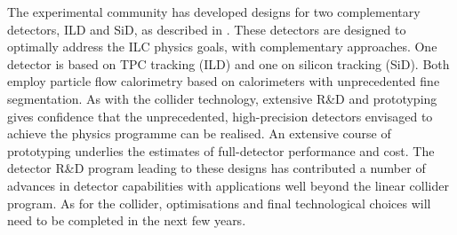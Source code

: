 The experimental community has developed
designs for two complementary detectors, ILD and SiD, 
as described in \cite{Behnke:2013lya}. These detectors are designed to 
optimally address the
ILC physics goals, with complementary approaches. One detector is based on
TPC tracking (ILD) and one on silicon tracking (SiD).
Both employ particle flow calorimetry based on
calorimeters with unprecedented fine segmentation.
As with the collider technology, 
extensive R\&D and prototyping gives confidence that the
unprecedented,
high-precision detectors envisaged to achieve the 
physics programme can be realised.
An extensive course of
prototyping underlies the estimates of full-detector performance 
and cost.  
The detector R\&D program leading to these designs
has 
contributed a number of advances in 
detector capabilities with applications well beyond the linear
collider program. 
As for the
collider, optimisations and final technological choices 
will need to be completed in the next few years. 

